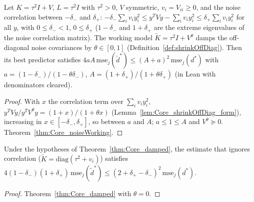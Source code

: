 \begin{theorem}\label{thm:Core_damped}
  \leanok
  Let $K = \tau^2I + V$, $L = \tau^2I$ with $\tau^2 > 0$, $V$ symmetric, $v_i = V_{ii} \ge 0$,
  and the noise correlation between $-\delta_-$ and $\delta_+$:
  $-\delta_-\sum_i v_iy_i^2 \le y^TVy - \sum_i v_iy_i^2 \le \delta_+\sum_i v_iy_i^2$ for all
  $y$, with $0 \le \delta_- < 1$, $0 \le \delta_+$ ($1-\delta_-$ and $1+\delta_+$ are the
  extreme eigenvalues of the noise correlation matrix). The working model
  $\tilde K = \tau^2I + V^\theta$ damps the off-diagonal noise covariances by
  $\theta \in [0,1]$ (Definition~\ref{def:shrinkOffDiag}). Then its best predictor satisfies
  $4aA\,\mathrm{mse}_j(\tilde d^*) \le (A+a)^2\,\mathrm{mse}_j(d^*)$ with
  $a = (1-\delta_-)/(1-\theta\delta_-)$, $A = (1+\delta_+)/(1+\theta\delta_+)$
  (in Lean with denominators cleared).
\end{theorem}
\begin{proof}
  \leanok
  With $x$ the correlation term over $\sum_i v_iy_i^2$, $y^TVy / y^TV^\theta y = (1+x)/(1+\theta x)$
  (Lemma~\ref{lem:Core_shrinkOffDiag_form}), increasing in $x \in [-\delta_-, \delta_+]$, so
  between $a$ and $A$; $a \le 1 \le A$ and $V^\theta \succeq 0$.
  Theorem~\ref{thm:Core_noiseWorking}.
\end{proof}

\begin{corollary}\label{cor:Core_ignoreCorr_two_sided}
  \leanok
  Under the hypotheses of Theorem~\ref{thm:Core_damped}, the estimate that ignores
  correlation ($\tilde K = \mathrm{diag}(\tau^2 + v_i)$) satisfies
  $4(1-\delta_-)(1+\delta_+)\,\mathrm{mse}_j(\tilde d^*) \le (2 + \delta_+ - \delta_-)^2\,\mathrm{mse}_j(d^*)$.
\end{corollary}
\begin{proof}
  \leanok
  Theorem~\ref{thm:Core_damped} with $\theta = 0$.
\end{proof}

